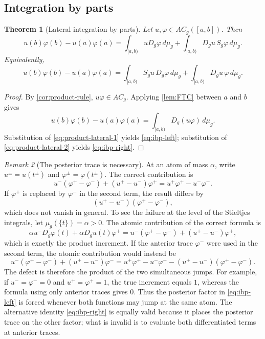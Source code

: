 \documentclass[preprint,12pt]{elsarticle}
\newenvironment{revision}{\begingroup\color{red}}{\endgroup}
\newenvironment{revision}{}{}
\newtheorem{theorem}{Theorem}[section]
\theoremstyle{definition}
\theoremstyle{remark}
\newtheorem{remark}[theorem]{Remark}
\newcommand{\mug}{\mu_g}
\newcommand{\ACg}{AC_g}
\begin{document}
\subsection{Integration by parts}

\begin{theorem}[Lateral integration by parts]\label{thm:ibp}
Let $u,\varphi\in\ACg([a,b])$. Then
\begin{equation}\label{eq:ibp-left}
 u(b)\varphi(b)-u(a)\varphi(a)
 =\int_{[a,b)}uD_g\varphi\,d\mug
 +\int_{[a,b)}D_gu\,S_g\varphi\,d\mug.
\end{equation}
Equivalently,
\begin{equation}\label{eq:ibp-right}
 u(b)\varphi(b)-u(a)\varphi(a)
 =\int_{[a,b)}S_gu\,D_g\varphi\,d\mug
 +\int_{[a,b)}D_gu\,\varphi\,d\mug.
\end{equation}
\end{theorem}

\begin{proof}
By \cref{cor:product-rule}, $u\varphi\in\ACg$. Applying \cref{lem:FTC} between $a$ and $b$ gives
\[
 u(b)\varphi(b)-u(a)\varphi(a)
 =\int_{[a,b)}D_g(u\varphi)\,d\mug.
\]
Substitution of \eqref{eq:product-lateral-1} yields \eqref{eq:ibp-left}; substitution of \eqref{eq:product-lateral-2} yields \eqref{eq:ibp-right}.
\end{proof}

\begin{remark}[The posterior trace is necessary]\label{rem:need-shift}
At an atom of mass $\alpha$, write $u^\pm=u(t^\pm)$ and $\varphi^\pm=\varphi(t^\pm)$. The correct contribution is
\[
 u^-(\varphi^+-\varphi^-)+(u^+-u^-)\varphi^+
 =u^+\varphi^+-u^-\varphi^-.
\]
If $\varphi^+$ is replaced by $\varphi^-$ in the second term, the result differs by
\[
 (u^+-u^-)(\varphi^+-\varphi^-),
\]
which does not vanish in general.
\begin{revision}
To see the failure at the level of the Stieltjes integrals, let
\(\mu_g(\{t\})=\alpha>0\).  The atomic contribution of the correct formula is
\[
 \alpha u^-D_g\varphi(t)+\alpha D_gu(t)\varphi^+
 =u^-(\varphi^+-\varphi^-)+(u^+-u^-)\varphi^+,
\]
which is exactly the product increment.  If the anterior trace \(\varphi^-\)
were used in the second term, the atomic contribution would instead be
\[
 u^-(\varphi^+-\varphi^-)+(u^+-u^-)\varphi^-
 =u^+\varphi^+-u^-\varphi^-
  -(u^+-u^-)(\varphi^+-\varphi^-).
\]
The defect is therefore the product of the two simultaneous jumps.  For example,
if \(u^-=\varphi^-=0\) and \(u^+=\varphi^+=1\), the true increment equals
\(1\), whereas the formula using only anterior traces gives \(0\).  Thus the
posterior factor in \eqref{eq:ibp-left} is forced whenever both functions may
jump at the same atom.  The alternative identity \eqref{eq:ibp-right} is equally
valid because it places the posterior trace on the other factor; what is invalid
is to evaluate both differentiated terms at anterior traces.
\end{revision}
\end{remark}
\end{document}
